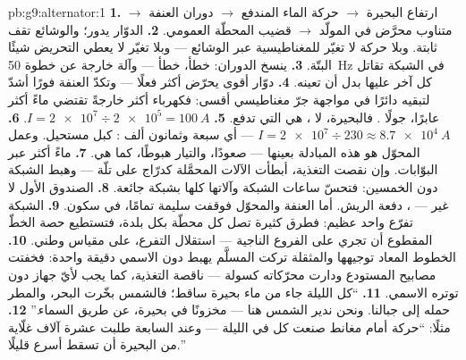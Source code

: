 \begin{solution}{pb:g9:alternator:1}
\textbf{1.} ارتفاع البحيرة $\to$ حركة الماء المندفع $\to$
دوران العنفة $\to$  متناوب محرَّض في المولّد $\to$ قضيب
المحطّة العمومي.
\textbf{2.}  الدوّار يدور؛ والوشائع تقف ثابتة. وبلا
حركة لا تغيّر للمغناطيسية عبر الوشائع --- وبلا تغيّر لا يعطي
التحريض شيئًا البتّة.
\textbf{3.}   ينسخ الدوران:  خطأ،  خطأ
--- وآلة خارجة عن خطوة \qty{50}{Hz} في الشبكة تقاتل كل  آخر عليها بدل أن تعينه.
\textbf{4.}  دوّار أقوى يحرّض أكثر فعلًا --- وتكدّ
العنفة فورًا أشدّ لتبقيه دائرًا في مواجهة جرّ مغناطيسي أقسى:
فكهرباء أكثر خارجةً تقتضي ماءً أكثر عابرًا، جولًا .
فالبحيرة، لا ، هي التي تدفع.
\textbf{5.} $I = \num{2e7} \div \num{2e5} = \qty{100}{A}$.
\textbf{6.} $I = \num{2e7} \div 230 \approx \qty{8.7e4}{A}$
--- أي سبعة وثمانون ألف : كبل مستحيل. وعمل المحوّل هو
هذه المبادلة بعينها ---  صعودًا، والتيار هبوطًا،
 كما هي.
\textbf{7.} ماءً أكثر عبر البوّابات. وإن نقصت التغذية، أبطأت
الآلات المحمَّلة كدرّاج على تلّة --- وهبط  الشبكة دون
الخمسين: فتحسّ ساعات الشبكة وآلاتها كلها بشبكة جائعة.
\textbf{8.} الصندوق الأول لا غير --- ، دفعة الريش. أما
العنفة  والمحوّل فوقفت سليمة تمامًا، في
سكون.
\textbf{9.} الشبكة تفرّع واحد عظيم: فطرق كثيرة تصل كل محطّة
بكل بلدة، فتستطيع حصة الخطّ المقطوع أن تجري على الفروع
الناجية --- استقلال التفرع، على مقياس وطني.
\textbf{10.} الخطوط المعاد توجيهها والمثقلة تركت 
المسلَّم يهبط دون الاسمي دقيقة واحدة: فخفتت مصابيح المستودع
ودارت محرّكاته كسولة --- ناقصة التغذية، كما يجب لأيّ جهاز دون
توتره الاسمي.
\textbf{11.} ``كل  الليلة جاء من ماء بحيرة ساقط؛ فالشمس
بخّرت البحر، والمطر حمله إلى جبالنا. ونحن ندير  الشمس هنا
--- مخزونًا في بحيرة، عن طريق السماء.''
\textbf{12.} مثلًا: ``حركة أمام مغانط صنعت كل  في الليلة
--- وعند السابعة طلبت عشرة آلاف غلّاية من البحيرة أن تسقط
أسرع قليلًا.''
\end{solution}
